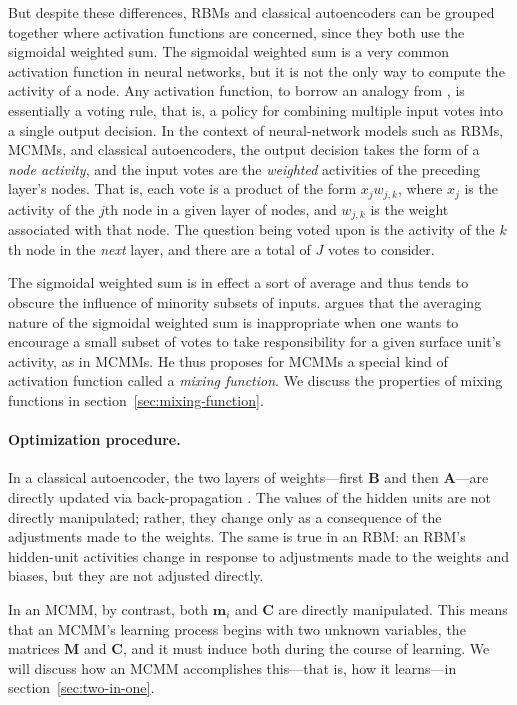 But despite these differences, RBMs and classical autoencoders can be grouped together where activation functions are concerned, since they both use the sigmoidal weighted sum.
The sigmoidal weighted sum is a very common activation function in neural networks, 
but it is not the only way to compute the activity of a node. Any activation function, to borrow
an analogy from \citet{saund:94}, is essentially a voting rule, that is,  a policy 
for combining multiple input votes into a single output decision.  
In the context of neural-network models such as RBMs, MCMMs, and 
classical autoencoders, the output decision takes the form of a \emph{node activity},
and the input votes are the \emph{weighted} activities of the preceding layer's nodes. 
That is, each vote is a product of the form $x_{j} w_{j,k}$, where $x_{j}$ is the activity 
of the $j$th node in a given layer of nodes, and $w_{j,k}$ is the weight associated with that 
node. The question being voted upon is the activity of the $k$th node in the 
\emph{next} layer, and there are
a total of $J$ votes to consider.

The sigmoidal weighted sum is in effect a sort of average and thus tends to obscure
the influence of minority subsets of inputs. \citet{saund:94} argues 
that the averaging nature of the sigmoidal weighted sum is inappropriate when one wants to encourage
a small subset of votes to take responsibility for a given surface unit's activity, as in MCMMs.
He thus proposes for MCMMs a special kind of activation function called a \emph{mixing function}.
We discuss the properties of mixing functions in 
section~\ref{sec:mixing-function}.

\paragraph{Optimization procedure.}  In a classical autoencoder, the two layers of 
weights---first $\textbf{B}$ and then $\textbf{A}$---are directly updated via 
back-propagation \citep{rumelhart-et-al:1985, hinton:1987, hinton:1987trans, bourlard:1988}.
The values of the hidden units are not directly manipulated; rather, they change  
only as a 
consequence of the adjustments made to the weights. The same is true in an RBM: 
an RBM's hidden-unit activities change in response to adjustments 
made to the weights and biases, but they are not
adjusted directly.

In an MCMM, by contrast, both $\textbf{m}_i$ and $\textbf{C}$ are directly manipulated. This means that
an MCMM's learning process begins with two unknown variables, the matrices $\textbf{M}$ and 
$\textbf{C}$, and it must induce both during the course of learning. We will discuss how an MCMM accomplishes this---that is, how it learns---in section~\ref{sec:two-in-one}.

